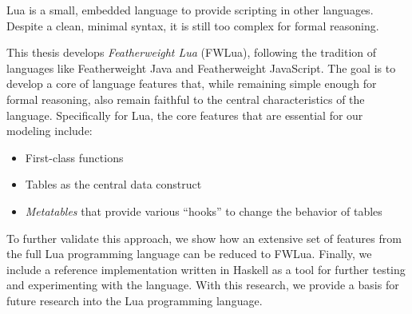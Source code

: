Lua is a small, embedded language to provide scripting in other languages.  Despite a clean, minimal syntax, it is still too complex for formal reasoning.

This thesis develops \emph{Featherweight Lua} (FWLua), following the tradition of languages like Featherweight Java\cite{FWJA} and Featherweight JavaScript\cite{FWJS}.  The goal is to develop a core of language features that, while remaining simple enough for formal reasoning, also remain faithful to the central characteristics of the language.  Specifically for Lua, the core features that are essential for our modeling include:
\begin{itemize}
\item
First-class functions
\item
Tables as the central data construct
\item
\emph{Metatables} that provide various ``hooks'' to change the behavior of tables
\end{itemize}

To further validate this approach, we show how an extensive set of features
from the full Lua programming language can be reduced to FWLua. Finally, we include a reference implementation written in Haskell as a tool for further testing and experimenting with the language. With this research, we provide a basis for future research into the Lua programming language.